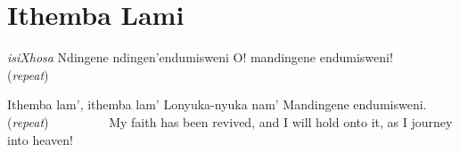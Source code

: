 \starttocol
\chapter{Ithemba Lami}
\nexttocol
\hfill{\it isiXhosa}
\stoptocol
\starttocol
\startlines
N{\sc dingene} ndingen'endumisweni
O! mandingene endumisweni!         \hfill ({\it repeat})~~~~~~~~~\hfill 

Ithemba lam', ithemba lam' 
Lonyuka-nyuka nam'
Mandingene endumisweni.            \hfill        ({\it repeat})~~~~~~~~~\hfill 
\stoplines
\nexttocol
My faith has been revived, and I will hold onto it, as I journey into heaven!
\stoptocol
